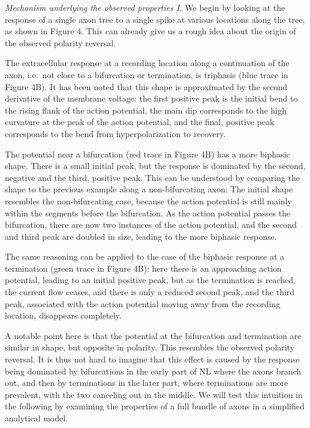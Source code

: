 \documentclass[]{article}
\begin{document}
\emph{Mechanism underlying the observed properties I.} We begin by
looking at the response of a single axon tree to a single spike at
various locations along the tree, as shown in Figure 4. This can already
give us a rough idea about the origin of the observed polarity reversal.

The extracellular response at a recording location along a continuation
of the axon, i.e.~not close to a bifurcation or termination, is
triphasic (blue trace in Figure 4B). It has been noted that this shape
is approximated by the second derivative of the membrane voltage: the
first positive peak is the initial bend to the rising flank of the
action potential, the main dip corresponds to the high curvature at the
peak of the action potential, and the final, positive peak corresponds
to the bend from hyperpolarization to recovery.

The potential near a bifurcation (red trace in Figure 4B) has a more
biphasic shape. There is a small initial peak, but the response is
dominated by the second, negative and the third, positive peak. This can
be understood by comparing the shape to the previous example along a
non-bifurcating axon: The initial shape resembles the non-bifurcating
case, because the action potential is still mainly within the segments
before the bifurcation. As the action potential passes the bifurcation,
there are now two instances of the action potential, and the second and
third peak are doubled in size, leading to the more biphasic response.

The same reasoning can be applied to the case of the biphasic response
at a termination (green trace in Figure 4B): here there is an
approaching action potential, leading to an initial positive peak, but
as the termination is reached, the current flow ceases, and there is
only a reduced second peak, and the third peak, associated with the
action potential moving away from the recording location, disappears
completely.

A notable point here is that the potential at the bifurcation and
termination are similar in shape, but opposite in polarity. This
resembles the observed polarity reversal. It is thus not hard to imagine
that this effect is caused by the response being dominated by
bifurcations in the early part of NL where the axons branch out, and
then by terminations in the later part, where terminations are more
prevalent, with the two canceling out in the middle. We will test this
intuition in the following by examining the properties of a full bundle
of axons in a simplified analytical model.
\end{document}
